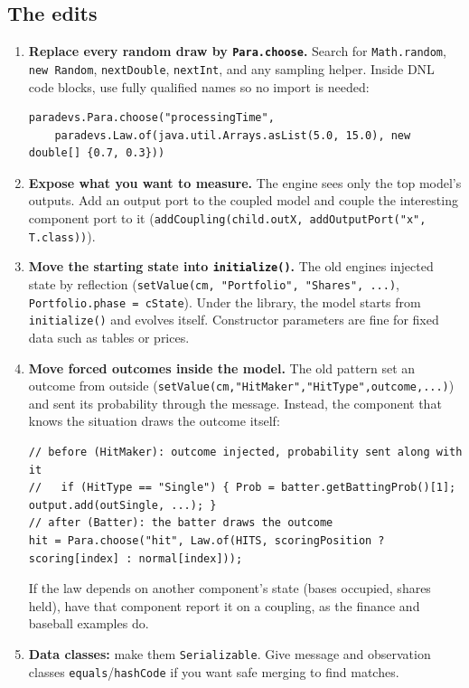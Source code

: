 \documentclass[11pt]{article}
\newcommand{\code}[1]{\texttt{#1}}
\begin{document}
\subsection{The edits}
\begin{enumerate}[label=\textbf{E\arabic*.}]
\item \textbf{Replace every random draw by \code{Para.choose}.} Search for \code{Math.random}, \code{new Random},
  \code{nextDouble}, \code{nextInt}, and any sampling helper. Inside DNL code blocks, use fully qualified names so no
  import is needed:
\begin{lstlisting}
paradevs.Para.choose("processingTime",
    paradevs.Law.of(java.util.Arrays.asList(5.0, 15.0), new double[] {0.7, 0.3}))
\end{lstlisting}
\item \textbf{Expose what you want to measure.} The engine sees only the top model's outputs. Add an output port to
  the coupled model and couple the interesting component port to it (\code{addCoupling(child.outX, addOutputPort("x", T.class))}).
\item \textbf{Move the starting state into \code{initialize()}.} The old engines injected state by reflection
  (\code{setValue(cm, "Portfolio", "Shares", ...)}, \code{Portfolio.phase = cState}). Under the library, the model starts
  from \code{initialize()} and evolves itself. Constructor parameters are fine for fixed data such as tables or prices.
\item \textbf{Move forced outcomes inside the model.} The old pattern set an outcome from outside
  (\code{setValue(cm,"HitMaker","HitType",outcome,...)}) and sent its probability through the message. Instead, the
  component that knows the situation draws the outcome itself:
\begin{lstlisting}
// before (HitMaker): outcome injected, probability sent along with it
//   if (HitType == "Single") { Prob = batter.getBattingProb()[1]; output.add(outSingle, ...); }
// after (Batter): the batter draws the outcome
hit = Para.choose("hit", Law.of(HITS, scoringPosition ? scoring[index] : normal[index]));
\end{lstlisting}
  If the law depends on another component's state (bases occupied, shares held), have that component report it on a
  coupling, as the finance and baseball examples do.
\item \textbf{Data classes:} make them \code{Serializable}. Give message and observation classes
  \code{equals}/\code{hashCode} if you want safe merging to find matches.
\end{enumerate}
\end{document}
